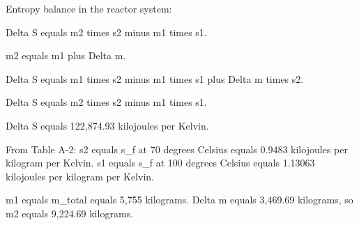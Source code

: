 Entropy balance in the reactor system:  

Delta S equals m2 times s2 minus m1 times s1.  

m2 equals m1 plus Delta m.  

Delta S equals m1 times s2 minus m1 times s1 plus Delta m times s2.  

Delta S equals m2 times s2 minus m1 times s1.  

Delta S equals 122,874.93 kilojoules per Kelvin.  

From Table A-2:  
s2 equals s_f at 70 degrees Celsius equals 0.9483 kilojoules per kilogram per Kelvin.  
s1 equals s_f at 100 degrees Celsius equals 1.13063 kilojoules per kilogram per Kelvin.  

m1 equals m_total equals 5,755 kilograms.  
Delta m equals 3,469.69 kilograms, so m2 equals 9,224.69 kilograms.
